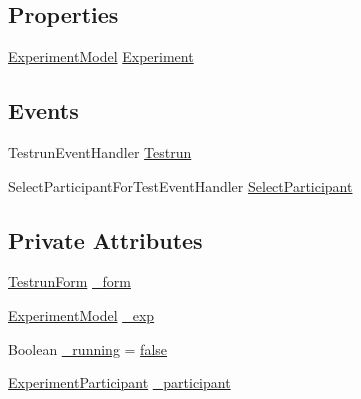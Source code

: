 \subsection*{Properties}
\begin{DoxyCompactItemize}
\item 
\hyperlink{class_web_analyzer_1_1_models_1_1_base_1_1_experiment_model}{Experiment\+Model} \hyperlink{class_web_analyzer_1_1_u_i_1_1_interaction_objects_1_1_testrun_control_a050243f65141cdf9dd7aa11125a30c0a}{Experiment}
\end{DoxyCompactItemize}
\subsection*{Events}
\begin{DoxyCompactItemize}
\item 
Testrun\+Event\+Handler \hyperlink{class_web_analyzer_1_1_u_i_1_1_interaction_objects_1_1_testrun_control_aec90f2bc94369619608e0059453752d3}{Testrun}
\item 
Select\+Participant\+For\+Test\+Event\+Handler \hyperlink{class_web_analyzer_1_1_u_i_1_1_interaction_objects_1_1_testrun_control_abf256e52c1a039ca329f7c749a9087e4}{Select\+Participant}
\end{DoxyCompactItemize}
\subsection*{Private Attributes}
\begin{DoxyCompactItemize}
\item 
\hyperlink{class_web_analyzer_1_1_u_i_1_1_testrun_form}{Testrun\+Form} \hyperlink{class_web_analyzer_1_1_u_i_1_1_interaction_objects_1_1_testrun_control_add6c2a6d01609147fdd302fece571636}{\+\_\+form}
\item 
\hyperlink{class_web_analyzer_1_1_models_1_1_base_1_1_experiment_model}{Experiment\+Model} \hyperlink{class_web_analyzer_1_1_u_i_1_1_interaction_objects_1_1_testrun_control_a9c232cac904a9ae80233456406563e03}{\+\_\+exp}
\item 
Boolean \hyperlink{class_web_analyzer_1_1_u_i_1_1_interaction_objects_1_1_testrun_control_a476e0340bbef94992b2a976db6f37d25}{\+\_\+running} = \hyperlink{_u_i_2_h_t_m_l_resources_2js_2src_2export_8js_ae6c865df784842196d411c1466b01686}{false}
\item 
\hyperlink{class_web_analyzer_1_1_models_1_1_base_1_1_experiment_participant}{Experiment\+Participant} \hyperlink{class_web_analyzer_1_1_u_i_1_1_interaction_objects_1_1_testrun_control_a6f2545f1b64a0d78e4584e5482dbd8b2}{\+\_\+participant}
\end{DoxyCompactItemize}


